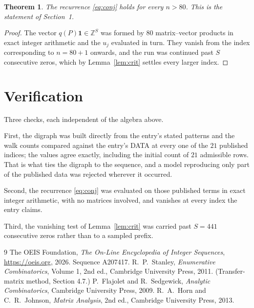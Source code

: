 \documentclass[11pt,a4paper]{article}
\theoremstyle{plain}
\newtheorem{theorem}{Theorem}
\theoremstyle{definition}
\begin{document}
\begin{theorem}
The recurrence \eqref{eq:conj} holds for every $n>80$. This is the statement of
Section~1.
\end{theorem}

\begin{proof}
The vector $q(P)\mathbf{1}\in\mathbb{Z}^{S}$ was formed by $80$ matrix--vector
products in exact integer arithmetic and the $u_j$ evaluated in turn. They vanish from the
index corresponding to $n=80+1$ onwards, and the run was continued past $S$ consecutive
zeros, which by Lemma~\ref{lem:crit} settles every larger index.
\end{proof}

\section{Verification}

Three checks, each independent of the algebra above.

First, the digraph was built directly from the entry's stated patterns and the walk counts
compared against the entry's DATA at every one of the $21$ published indices; the
values agree exactly, including the initial count of $21$ admissible rows. That is
what ties the digraph to the sequence, and a model reproducing only part of the published
data was rejected wherever it occurred.

Second, the recurrence \eqref{eq:conj} was evaluated on those published terms in exact
integer arithmetic, with no matrices involved, and vanishes at every index the entry claims.

Third, the vanishing test of Lemma~\ref{lem:crit} was carried past $S=441$ consecutive
zeros rather than to a sampled prefix.

\begin{thebibliography}{9}
 The OEIS Foundation, \emph{The On-Line Encyclopedia of Integer
Sequences}, \url{https://oeis.org}, 2026. Sequence A207417.
 R.~P.~Stanley, \emph{Enumerative Combinatorics}, Volume 1, 2nd ed.,
Cambridge University Press, 2011. (Transfer-matrix method, Section 4.7.)
 P.~Flajolet and R.~Sedgewick, \emph{Analytic Combinatorics}, Cambridge
University Press, 2009.
 R.~A.~Horn and C.~R.~Johnson, \emph{Matrix Analysis}, 2nd ed., Cambridge
University Press, 2013.
\end{thebibliography}
\end{document}
